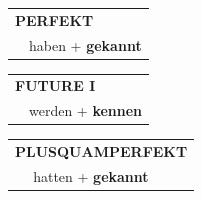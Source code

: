 \documentclass[10pt,a4paper]{revtex4-2}
\begin{document}
\begin{verbbox-acc}
    \vspace{10pt}

 \begin{tabular}{rl}
     \multicolumn{2}{l}{\textbf{PERFEKT}}\\
  &  haben + \textbf{gekannt}\\
  \end{tabular}
\hfill
   \begin{tabular}{rl}
   
    \multicolumn{2}{l}{\textbf{FUTURE I} }\\
  &  werden + \textbf{kennen}\\
 
  \end{tabular}
\hfill
   \begin{tabular}{rl}
      \multicolumn{2}{l}{\textbf{PLUSQUAMPERFEKT}}\\
   & hatten + \textbf{gekannt}\\
  \end{tabular}
  
  \vspace{-5pt}


\end{verbbox-acc}
\end{document}
